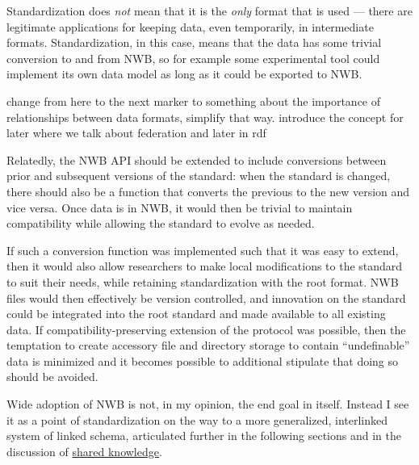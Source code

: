 \documentclass[nohyper]{tufte-book-jls}
\begin{document}
Standardization does \emph{not} mean that it is the \emph{only} format
that is used --- there are legitimate applications for keeping data,
even temporarily, in intermediate formats. Standardization, in this
case, means that the data has some trivial conversion to and from NWB,
so for example some experimental tool could implement its own data model
as long as it could be exported to NWB.

\begin{leftbar}
\begin{leftbar}
\begin{leftbar}
change from here to the next marker to something about the importance of
relationships between data formats, simplify that way. introduce the
concept for later where we talk about federation and later in rdf
\end{leftbar}
\end{leftbar}
\end{leftbar}

Relatedly, the NWB API should be extended to include conversions between
prior and subsequent versions of the standard: when the standard is
changed, there should also be a function that converts the previous to
the new version and vice versa. Once data is in NWB, it would then be
trivial to maintain compatibility while allowing the standard to evolve
as needed.

If such a conversion function was implemented such that it was easy to
extend, then it would also allow researchers to make local modifications
to the standard to suit their needs, while retaining standardization
with the root format. NWB files would then effectively be version
controlled, and innovation on the standard could be integrated into the
root standard and made available to all existing data. If
compatibility-preserving extension of the protocol was possible, then
the temptation to create accessory file and directory storage to contain
``undefinable'' data is minimized and it becomes possible to additional
stipulate that doing so should be avoided.

\begin{leftbar}
\begin{leftbar}
\begin{leftbar}
\end{leftbar}
\end{leftbar}
\end{leftbar}

Wide adoption of NWB is not, in my opinion, the end goal in itself.
Instead I see it as a point of standardization on the way to a more
generalized, interlinked system of linked schema, articulated further in
the following sections and in the discussion of
\protect\hyperlink{shared-knowledge}{shared knowledge}.
\end{document}
